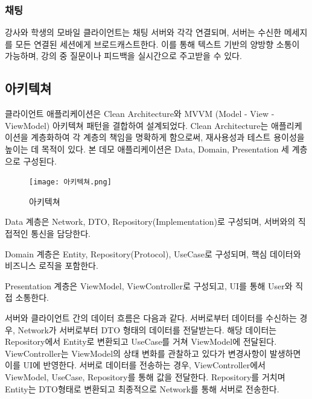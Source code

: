 \documentclass[a4paper]{article}
\begin{document}
\subsubsection{채팅}
강사와 학생의 모바일 클라이언트는 채팅 서버와 각각 연결되며, 서버는 수신한 메세지를 모든 연결된 세션에게 브로드캐스트한다. 이를 통해 텍스트 기반의 양방향 소통이 가능하며, 강의 중 질문이나 피드백을 실시간으로 주고받을 수 있다.
\subsection{아키텍쳐}
클라이언트 애플리케이션은 Clean Architecture와 MVVM (Model - View - ViewModel) 아키텍쳐 패턴을 결합하여 설계되었다. Clean Architecture는 애플리케이션을 계층화하여 각 계층의 책임을 명확하게 함으로써, 재사용성과 테스트 용이성을 높이는 데 목적이 있다. 본 데모 애플리케이션은 Data, Domain, Presentation 세 계층으로 구성된다.
\begin{figure}[htbp]
    \begin{center}
    \texttt{[image: 아키텍쳐.png]}
    \caption{아키텍쳐}
    \label{fig:fig2}
    \end{center}
\end{figure}

Data 계층은 Network, DTO, Repository(Implementation)로 구성되며, 서버와의 직접적인 통신을 담당한다.

Domain 계층은 Entity, Repository(Protocol), UseCase로 구성되며, 핵심 데이터와 비즈니스 로직을 포함한다.

Presentation 계층은 ViewModel, ViewController로 구성되고, UI를 통해 User와 직접 소통한다.

서버와 클라이언트 간의 데이터 흐름은 다음과 같다.
서버로부터 데이터를 수신하는 경우, Network가 서버로부터 DTO 형태의 데이터를 전달받는다. 해당 데이터는 Repository에서 Entity로 변환되고 UseCase를 거쳐 ViewModel에 전달된다. ViewController는 ViewModel의 상태 변화를 관찰하고 있다가 변경사항이 발생하면 이를 UI에 반영한다.
서버로 데이터를 전송하는 경우, ViewController에서 ViewModel, UseCase, Repository를 통해 값을 전달한다. Repository를 거치며 Entity는 DTO형태로 변환되고 최종적으로 Network를 통해 서버로 전송한다.
\newpage
\end{document}
